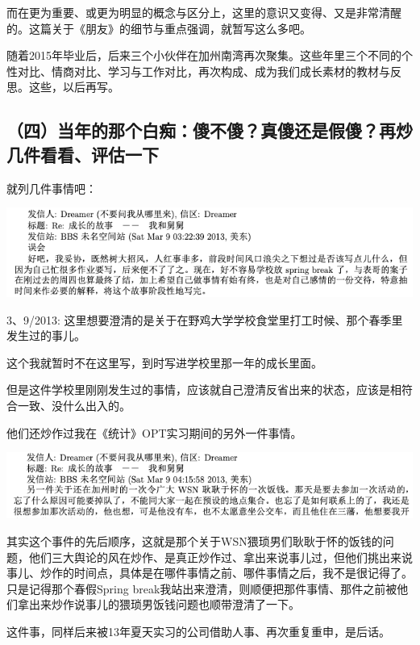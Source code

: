 \documentclass[9pt, b5paper]{article}
\begin{document}
而在更为重要、或更为明显的概念与区分上，这里的意识又变得、又是非常清醒的。这篇关于《朋友》的细节与重点强调，就暂写这么多吧。

随着2015年毕业后，后来三个小伙伴在加州南湾再次聚集。这些年里三个不同的个性对比、情商对比、学习与工作对比，再次构成、成为我们成长素材的教材与反思。这些，以后再写。

\subsection{（四）当年的那个白痴：傻不傻？真傻还是假傻？再炒几件看看、评估一下}
\label{sec:org033f05e}

就列几件事情吧：

\begin{center}
\includegraphics[width=.9\linewidth]{./pic/backups_plans_20210424_103008.png}
\end{center}

3、9/2013: 这里想要澄清的是关于在野鸡大学学校食堂里打工时候、那个春季里发生过的事儿。

这个我就暂时不在这里写，到时写进学校里那一年的成长里面。

但是这件学校里刚刚发生过的事情，应该就自己澄清反省出来的状态，应该是相符合一致、没什么出入的。 

他们还炒作过我在《统计》OPT实习期间的另外一件事情。 

\begin{center}
\includegraphics[width=.9\linewidth]{./pic/backups_plans_20210424_103043.png}
\end{center}

其实这个事件的先后顺序，这就是那个关于WSN猥琐男们耿耿于怀的饭钱的问题，他们三大舆论的风在炒作、是真正炒作过、拿出来说事儿过，但他们挑出来说事儿、炒作的时间点，具体是在哪件事情之前、哪件事情之后，我不是很记得了。只是记得那个春假Spring break我站出来澄清，则顺便把那件事情、那件之前被他们拿出来炒作说事儿的猥琐男饭钱问题也顺带澄清了一下。

这件事，同样后来被13年夏天实习的公司借助人事、再次重复重申，是后话。 
\end{document}
